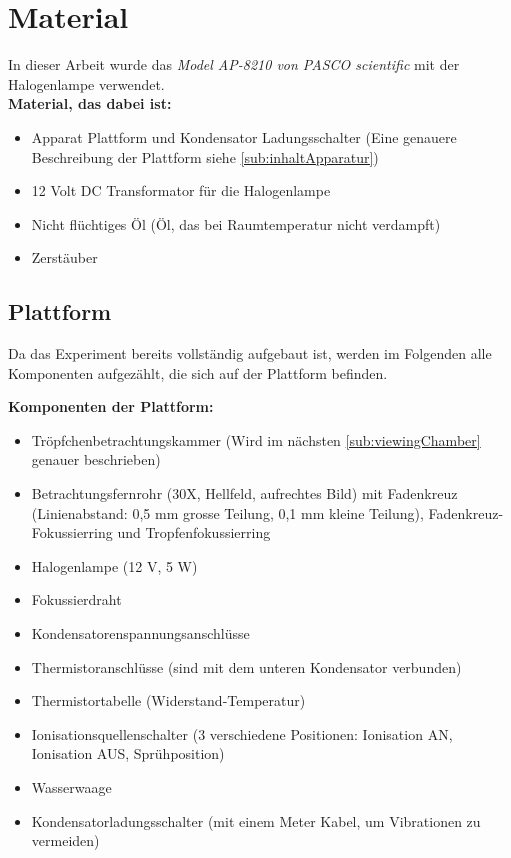 \section{Material}\label{sec:material}

In dieser Arbeit wurde das \textit{Model AP-8210 von PASCO scientific} mit der Halogenlampe verwendet. \\

\noindent \textbf{Material, das dabei ist:}

\begin{itemize}
	\item Apparat Plattform und Kondensator Ladungsschalter (Eine genauere Beschreibung der Plattform siehe \autoref{sub:inhaltApparatur})
	\item 12 Volt DC Transformator für die Halogenlampe
	\item Nicht flüchtiges Öl (Öl, das bei Raumtemperatur nicht verdampft)
	\item Zerstäuber
\end{itemize}

\subsection{Plattform}\label{sub:inhaltApparatur}
Da das Experiment bereits vollständig aufgebaut ist, werden im Folgenden alle Komponenten aufgezählt, die sich auf der Plattform befinden.

\noindent \textbf{Komponenten der Plattform:}

\begin{itemize}\label{item:apparatur}
	\item Tröpfchenbetrachtungskammer (Wird im nächsten \autoref{sub:viewingChamber} genauer beschrieben)
	\item Betrachtungsfernrohr (30X, Hellfeld, aufrechtes Bild) mit Fadenkreuz (Linienabstand: 0,5 mm grosse Teilung, 0,1 mm kleine Teilung), Fadenkreuz-Fokussierring und Tropfenfokussierring
	\item Halogenlampe (12 V, 5 W)
	\item Fokussierdraht
	\item Kondensatorenspannungsanschlüsse
	\item Thermistoranschlüsse (sind mit dem unteren Kondensator verbunden)
	\item Thermistortabelle (Widerstand-Temperatur)
	\item Ionisationsquellenschalter (3 verschiedene Positionen: Ionisation AN, Ionisation AUS, Sprühposition)
	\item Wasserwaage
	\item Kondensatorladungsschalter (mit einem Meter Kabel, um Vibrationen zu vermeiden)
\end{itemize}


